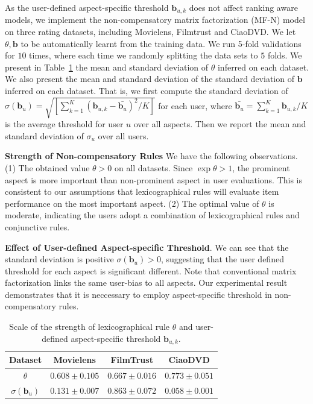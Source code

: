 \documentclass[letterpaper]{article} %
\begin{document}
As the user-defined aspect-specific threshold $\mathbf{b}_{u,k}$ does not affect ranking aware models, we implement the non-compensatory matrix factorization (MF-N) model on three rating datasets, including Movielens, Filmtrust and CiaoDVD. We let $\theta,\mathbf{b}$ to be automatically learnt from the training data. We run 5-fold validations for $10$ times, where each time we randomly splitting the data sets to $5$ folds. We present in Table~\ref{tab:parameters} the mean and standard deviation of $\theta$ inferred on each dataset. We also present the mean and standard deviation of the standard deviation of $\mathbf{b}$ inferred on each dataset. That is, we first compute the standard deviation of $\sigma(\mathbf{b}_u)=\sqrt {[\sum_{k=1}^{K} (\mathbf{b}_{u,k}-\bar{\mathbf{b}_u})^2 /K]} $ for each user, where $\bar{\mathbf{b}_u}=\sum_{k=1}^K \mathbf{b}_{u,k} /K$ is the average threshold for user $u$ over all aspects. Then we report the mean and standard deviation of $\sigma_u$ over all users. 


\textbf{Strength of Non-compensatory Rules}
We have the following observations. (1) The obtained value $\theta>0$ on all datasets. Since $\exp\theta>1$, the prominent aspect is more important than non-prominent aspect in user evaluations. This is consistent to our assumptions that lexicographical rules will evaluate item performance on the most important aspect. (2)  The optimal value of $\theta$ is  moderate, indicating the users adopt a combination of lexicographical rules and conjunctive rules.  

\textbf{Effect of User-defined Aspect-specific Threshold}. We can see that the standard deviation is positive $\sigma(\mathbf{b}_{u})>0$, suggesting that the user defined threshold for each aspect is significant different. Note that conventional matrix factorization links the same user-bias to all aspects. Our experimental result demonstrates that it is neccessary to employ aspect-specific threshold in non-compensatory rules. 
\begin{table}[htp]
\tiny
\caption{Scale of the strength of lexicographical rule $\theta$ and user-defined aspect-specific threshold $\mathbf{b}_{u,k}$.}
\begin{center}
\begin{tabular}{|c|c|c|c|}
\hline
Dataset & Movielens & FilmTrust & CiaoDVD \\\hline
$\theta$ & $0.608\pm 0.105$ & $0.667\pm 0.016$ &	$0.773\pm 0.051$\\\hline
$\sigma(\mathbf{b}_{u})$ & $0.131\pm 0.007$ &	$0.863\pm 0.072$	& $0.058\pm 0.001$  \\\hline
\end{tabular}
\vspace*{-10pt}
\end{center}
\label{tab:parameters}
\end{table}%
\end{document}
